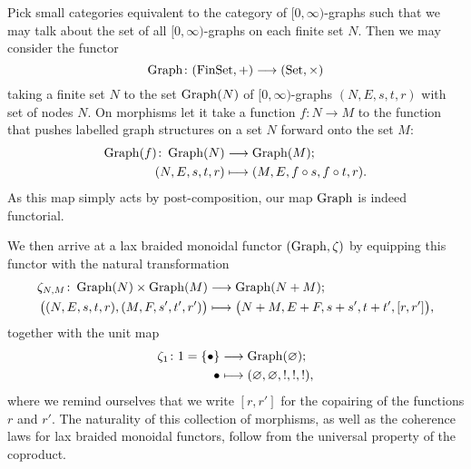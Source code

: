 Pick small categories equivalent to the category of $[0,\infty)$-graphs such
that we may talk about the set of all $[0,\infty)$-graphs on each finite set
$N$.  Then we may consider the functor
\[
  \operatorname{Graph}\colon  (\mathrm{FinSet},+) \longrightarrow (\mathrm{Set},\times)
\]
taking a finite set $N$ to the set $\operatorname{Graph}(N)$ of $[0,\infty)$-graphs
$(N,E,s,t,r)$ with set of nodes $N$. On
morphisms let it take a function $f\colon N \to M$ to the function that pushes
labelled graph structures on a set $N$ forward onto the set $M$:
\begin{align*}
  \operatorname{Graph}(f)\colon  \operatorname{Graph}(N) &\longrightarrow
  \operatorname{Graph}(M); \\
  (N,E,s,t,r) &\longmapsto (M,E,f \circ s, f \circ t, r).
\end{align*}
As this map simply acts by post-composition, our map $\operatorname{Graph}$ is indeed
functorial.

We then arrive at a lax braided monoidal functor $(\operatorname{Graph},\zeta)$ by equipping
this functor with the natural transformation 
\begin{align*}
  \zeta_{N,M}\colon  \operatorname{Graph}(N) \times \operatorname{Graph}(M)
  &\longrightarrow \operatorname{Graph}(N+M); \\
  \big( (N,E,s,t,r), (M,F,s',t',r') \big) &\longmapsto
  \big(N+M,E+F,s+s',t+t',[r,r']\big),
\end{align*}
together with the unit map
\begin{align*}
  \zeta_1\colon  1=\{\bullet\} &\longrightarrow \operatorname{Graph}(\varnothing); \\
  \bullet &\longmapsto
  (\varnothing,\varnothing,!,!,!),
\end{align*}
where we remind ourselves
that we write $[r,r']$ for the copairing of the functions $r$ and $r'$. The
naturality of this collection of morphisms, as well as the coherence laws for
lax braided monoidal functors, follow from the universal property of the coproduct.

